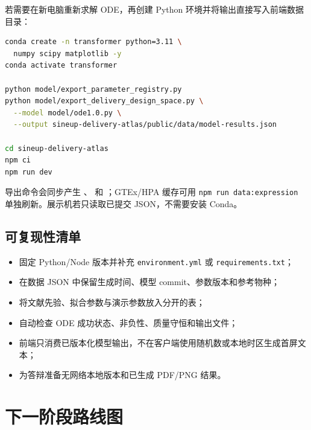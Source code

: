\documentclass[UTF8,11pt,a4paper]{ctexart}
\newcommand{\code}[1]{\texttt{#1}}
\begin{document}
若需要在新电脑重新求解 ODE，再创建 Python 环境并将输出直接写入前端数据目录：
\begin{lstlisting}[language=bash]
conda create -n transformer python=3.11 \
  numpy scipy matplotlib -y
conda activate transformer

python model/export_parameter_registry.py
python model/export_delivery_design_space.py \
  --model model/ode1.0.py \
  --output sineup-delivery-atlas/public/data/model-results.json

cd sineup-delivery-atlas
npm ci
npm run dev
\end{lstlisting}
导出命令会同步产生 、 和 ；GTEx/HPA 缓存可用 \code{npm run data:expression} 单独刷新。展示机若只读取已提交 JSON，不需要安装 Conda。

\subsection{可复现性清单}
\begin{itemize}
  \item 固定 Python/Node 版本并补充 \code{environment.yml} 或 \code{requirements.txt}；
  \item 在数据 JSON 中保留生成时间、模型 commit、参数版本和参考物种；
  \item 将文献先验、拟合参数与演示参数放入分开的表；
  \item 自动检查 ODE 成功状态、非负性、质量守恒和输出文件；
  \item 前端只消费已版本化模型输出，不在客户端使用随机数或本地时区生成首屏文本；
  \item 为答辩准备无网络本地版本和已生成 PDF/PNG 结果。
\end{itemize}

\section{下一阶段路线图}
\end{document}
